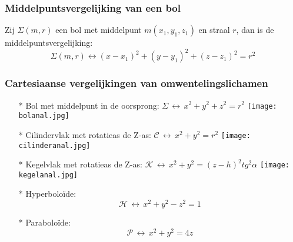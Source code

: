 \subsubsection{Middelpuntsvergelijking van een bol} \label{vergelijking_bol}
\hypertarget{vergelijking_bol}{}
Zij $\Sigma (m, r)$ een bol met middelpunt $m(x_1, y_1, z_1)$ en straal $r$, dan is de middelpuntsvergelijking:
\[\Sigma (m, r) \leftrightarrow (x-x_1)^2 + (y-y_1)^2 + (z-z_1)^2=r^2\]

\subsubsection{Cartesiaanse vergelijkingen van omwentelingslichamen} \label{vergelijking_omwentelingslichamen}
\hypertarget{vergelijking_omwentelingslichamen}{}
\begin{itemize}
\item[*] Bol met middelpunt in de oorsprong:\vskip 0.5cm
$\Sigma \,\leftrightarrow\, x^2+y^2+z^2=r^2$\newline
\texttt{[image: bolanal.jpg]}
\item[*] Cilindervlak met rotatieas de Z-as:\vskip 0.5cm
$\mathcal{C} \,\leftrightarrow\, x^2+y^2=r^2$\newline
\texttt{[image: cilinderanal.jpg]}
\item[*] Kegelvlak met rotatieas de Z-as:\vskip 0.5cm
$\mathcal{K} \,\leftrightarrow\, x^2+y^2=(z-h)^2tg^2\alpha$\newline
\texttt{[image: kegelanal.jpg]}
\item[*] Hyperbolo\"ide:\newline
\[\mathcal{H} \,\leftrightarrow\, x^2+y^2-z^2=1\]
\item[*] Parabolo\"ide:\newline
\[\mathcal{P}\, \leftrightarrow\, x^2+y^2=4z\]
\end{itemize}


